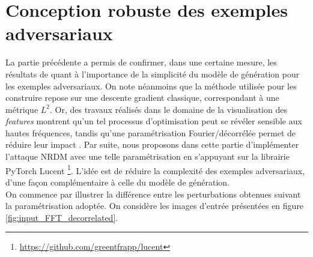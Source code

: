 \documentclass{article}
\begin{document}
\section{Conception robuste des exemples adversariaux}

La partie précédente a permis de confirmer, dans une certaine mesure, les résultats de \citet{Demontis2018WhyDA} quant à l'importance de la simplicité du modèle de génération pour les exemples adversariaux. On note néanmoins que la méthode utilisée pour les construire repose sur une descente gradient classique, correspondant à une métrique $L^2$. Or, des travaux réalisés dans le domaine de la visualisation des \textit{features} montrent qu'un tel processus d'optimisation peut se révéler sensible aux hautes fréquences, tandis qu'une paramétrisation Fourier/décorrélée permet de réduire leur impact \cite{FeatVizualize}. Par suite, nous proposons dans cette partie d'implémenter l'attaque NRDM avec une telle paramétrisation en s'appuyant sur la librairie PyTorch Lucent \footnote{\url{https://github.com/greentfrapp/lucent}}. L'idée est de réduire la complexité des exemples adversariaux, d'une façon complémentaire à celle du modèle de génération.\\

\noindent On commence par illustrer la différence entre les perturbations obtenues suivant la paramétrisation adoptée. On considère les images d'entrée présentées en figure \ref{fig:input_FFT_decorrelated}.
\end{document}

